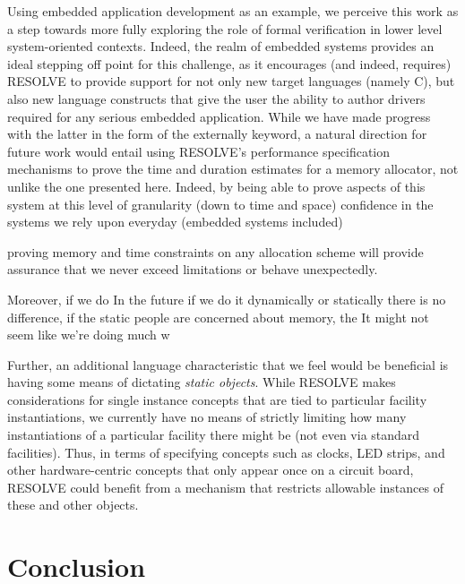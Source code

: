 Using embedded application development as an example, we perceive this work as a step towards more fully exploring the role of formal verification in lower level system-oriented contexts. Indeed, the realm of embedded systems provides an ideal stepping off point for this challenge, as it encourages (and indeed, requires) RESOLVE to provide support for not only new target languages (namely C), but also new language constructs that give the user the ability to author drivers required for any serious embedded application. While we have made progress with the latter in the form of the externally keyword, a natural direction for future work would entail using RESOLVE's performance specification mechanisms to prove the time and duration estimates for a memory allocator, not unlike the one presented here. Indeed, by being able to prove aspects of this system at this level of granularity (down to time and space) confidence in the systems we rely upon everyday (embedded systems included) 

proving memory and time constraints on any allocation scheme will provide assurance that we never exceed limitations or behave unexpectedly.

Moreover, if we do In the future if we do it dynamically or statically there is no difference, if the static people are concerned about memory, the It might not seem like we're doing much w

Further, an additional language characteristic that we feel would be beneficial is having some means of dictating \textit{static objects}. While RESOLVE makes considerations for single instance concepts that are tied to particular facility instantiations, we currently have no means of strictly limiting how many instantiations of a particular facility there might be (not even via standard facilities). Thus, in terms of specifying concepts such as clocks, LED strips, and other hardware-centric concepts that only appear once on a circuit board, RESOLVE could benefit from a mechanism that restricts allowable instances of these and other objects. 

\section{Conclusion}

